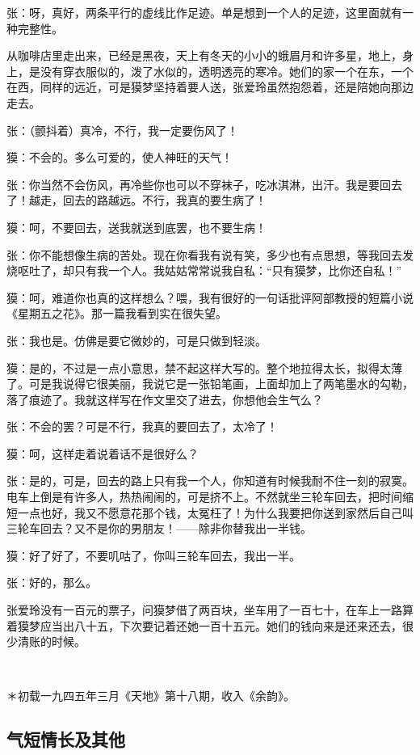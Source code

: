 \par 张：呀，真好，两条平行的虚线比作足迹。单是想到一个人的足迹，这里面就有一种完整性。
\par 从咖啡店里走出来，已经是黑夜，天上有冬天的小小的蛾眉月和许多星，地上，身上，是没有穿衣服似的，泼了水似的，透明透亮的寒冷。她们的家一个在东，一个在西，同样的远近，可是獏梦坚持着要人送，张爱玲虽然抱怨着，还是陪她向那边走去。
\par 张：（颤抖着）真冷，不行，我一定要伤风了！
\par 獏：不会的。多么可爱的，使人神旺的天气！
\par 张：你当然不会伤风，再冷些你也可以不穿袜子，吃冰淇淋，出汗。我是要回去了！越走，回去的路越远。不行，我真的要生病了！
\par 獏：呵，不要回去，送我就送到底罢，也不要生病！
\par 张：你不能想像生病的苦处。现在你看我有说有笑，多少也有点思想，等我回去发烧呕吐了，却只有我一个人。我姑姑常常说我自私：“只有獏梦，比你还自私！”
\par 獏：呵，难道你也真的这样想么？喂，我有很好的一句话批评阿部教授的短篇小说《星期五之花》。那一篇我看到实在很失望。
\par 张：我也是。仿佛是要它微妙的，可是只做到轻淡。
\par 獏：是的，不过是一点小意思，禁不起这样大写的。整个地拉得太长，拟得太薄了。可是我说得它很美丽，我说它是一张铅笔画，上面却加上了两笔墨水的勾勒，落了痕迹了。我就这样写在作文里交了进去，你想他会生气么？
\par 张：不会的罢？可是不行，我真的要回去了，太冷了！
\par 獏：呵，这样走着说着话不是很好么？
\par 张：是的，可是，回去的路上只有我一个人，你知道有时候我耐不住一刻的寂寞。电车上倒是有许多人，热热闹闹的，可是挤不上。不然就坐三轮车回去，把时间缩短一点也好，我又不愿意花那个钱，太冤枉了！为什么我要把你送到家然后自己叫三轮车回去？又不是你的男朋友！——除非你替我出一半钱。
\par 獏：好了好了，不要叽咕了，你叫三轮车回去，我出一半。
\par 张：好的，那么。
\par 张爱玲没有一百元的票子，问獏梦借了两百块，坐车用了一百七十，在车上一路算着獏梦应当出八十五，下次要记着还她一百十五元。她们的钱向来是还来还去，很少清账的时候。
\par  
\par ＊初载一九四五年三月《天地》第十八期，收入《余韵》。


\subsection{气短情长及其他}

